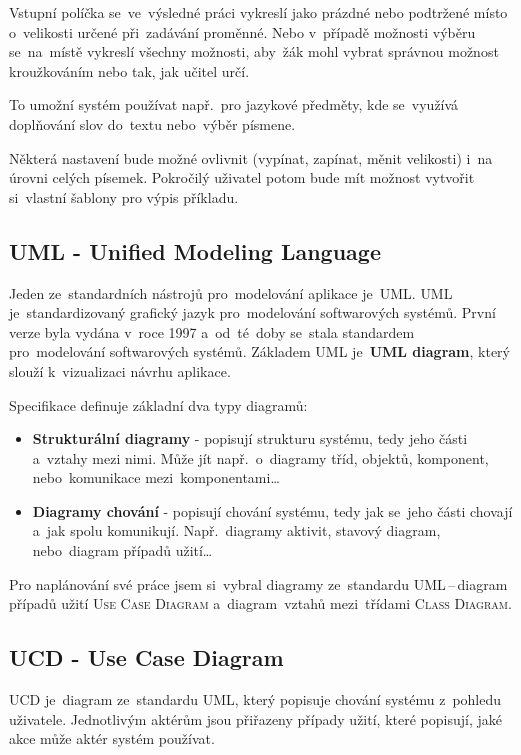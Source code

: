 \documentclass[14pt,a4paper]{article}
\begin{document}
        Vstupní políčka se~ve~výsledné práci vykreslí jako prázdné nebo podtržené místo o~velikosti určené při~zadávání proměnné. Nebo v~případě možnosti výběru se~na~místě vykreslí všechny možnosti, aby~žák mohl vybrat správnou možnost kroužkováním nebo tak, jak učitel určí.
        
        To umožní systém používat např.~pro jazykové předměty, kde se~využívá doplňování slov do~textu nebo~výběr písmene.

        Některá nastavení bude možné ovlivnit (vypínat, zapínat, měnit velikosti) i~na úrovni celých písemek. Pokročilý uživatel potom bude mít možnost vytvořit si~vlastní šablony pro výpis příkladu.

        \subsection{UML - Unified Modeling Language}
        Jeden ze~standardních nástrojů pro~modelování aplikace je~\textsc{UML}. \textsc{UML} je~standardizovaný grafický jazyk pro~modelování softwarových systémů. První verze byla vydána v~roce 1997 a~od~té~doby se~stala standardem pro~modelování softwarových systémů.
        Základem \textsc{UML} je~\textbf{UML diagram}, který slouží k~vizualizaci návrhu aplikace. \parencite{uml:diagram}
        
        Specifikace definuje základní dva typy diagramů:
        \begin{itemize}
            \item \textbf{Strukturální diagramy} - popisují strukturu systému, tedy jeho části a~vztahy mezi nimi. Může jít např.~o~diagramy tříd, objektů, komponent, nebo~komunikace mezi~komponentami\dots
            \item \textbf{Diagramy chování} - popisují chování systému, tedy jak se~jeho části chovají a~jak spolu komunikují. Např.~diagramy aktivit, stavový diagram, nebo~diagram případů užití\dots
        \end{itemize}

        Pro naplánování své práce jsem si~vybral diagramy ze~standardu \textsc{UML}\,--\,diagram případů užití \textsc{Use Case Diagram} a~diagram~vztahů mezi~třídami \textsc{Class Diagram}.

        \subsection{UCD - Use Case Diagram}
        \textsc{UCD} je~diagram ze~standardu \textsc{UML}, který popisuje chování systému z~pohledu uživatele. Jednotlivým aktérům jsou přiřazeny případy užití, které popisují, jaké akce může aktér systém používat.
\end{document}
